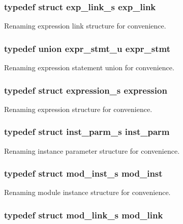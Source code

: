 \subsubsection{\setlength{\rightskip}{0pt plus 5cm}typedef struct {\bf exp\_\-link\_\-s} {\bf exp\_\-link}}\label{defines_8h_a164}


Renaming expression link structure for convenience. 
\subsubsection{\setlength{\rightskip}{0pt plus 5cm}typedef union {\bf expr\_\-stmt\_\-u} {\bf expr\_\-stmt}}\label{defines_8h_a158}


Renaming expression statement union for convenience. 
\subsubsection{\setlength{\rightskip}{0pt plus 5cm}typedef struct {\bf expression\_\-s} {\bf expression}}\label{defines_8h_a159}


Renaming expression structure for convenience. 
\subsubsection{\setlength{\rightskip}{0pt plus 5cm}typedef struct {\bf inst\_\-parm\_\-s} {\bf inst\_\-parm}}\label{defines_8h_a169}


Renaming instance parameter structure for convenience. 
\subsubsection{\setlength{\rightskip}{0pt plus 5cm}typedef struct {\bf mod\_\-inst\_\-s} {\bf mod\_\-inst}}\label{defines_8h_a177}


Renaming module instance structure for convenience. 
\subsubsection{\setlength{\rightskip}{0pt plus 5cm}typedef struct {\bf mod\_\-link\_\-s} {\bf mod\_\-link}}\label{defines_8h_a171}



